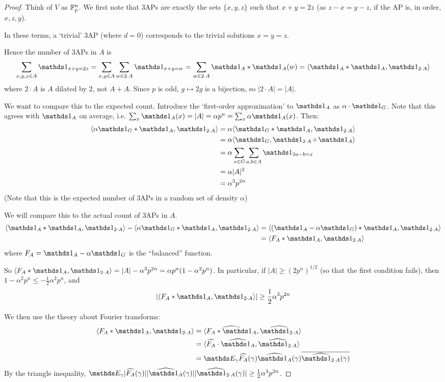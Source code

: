 \documentclass[10pt,a4paper]{article}
\begin{document}
\begin{proof}
  Think of $V$ as $\mathbb{F}_p^n$. We first note that 3APs are exactly the sets $\{x,y,z\}$ such that $x+y=2z$ (as $z-x = y-z$, if the AP is, in order, $x,z,y$).

  In these terms, a `trivial' 3AP (where $d=0$) corresponds to the trivial solutions $x=y=z$.

  Hence the number of 3APs in $A$ is
  \[\sum_{x,y,z \in A} \one_{x+y=2z} = \sum_{x,y \in A} \sum_{w \in 2\cdot A} \one_{x+y=w} = \sum_{w \in 2\cdot A} \one_A \ast \one_A(w) = \angle{\one_A \ast \one_A, \one_{2\cdot A}}\]
  where $2\cdot A$ is $A$ dilated by $2$, not $A+A$. Since $p$ is odd, $g \mapsto 2g$ is a bijection, so $|2\cdot A| = |A|$.

  We want to compare this to the expected count. Introduce the `first-order approximation' to $\one_A$ as $\alpha \cdot \one_G$. Note that this agrees with $\one_A$ on average, i.e. $\sum_x \one_A(x) = |A| = \alpha p^n = \sum_x \alpha \one_A(x)$. Then:
  \begin{align*}
    \angle{\alpha \one_G \ast \one_A, \one_{2\cdot A}} &= \alpha \angle{\one_G\ast \one_A, \one_{2\cdot A}}\\
    &= \alpha \angle{\one_G, \one_{2\cdot A} \circ \one_A}\\
    &= \alpha \sum_{x \in G}\sum_{a,b \in A} \one_{2a-b =x}\\
    &= \alpha|A|^2\\
    &= \alpha^3p^{2n}
  \end{align*}
  (Note that this is the expected number of 3APs in a random set of density $\alpha$)

  We will compare this to the actual count of 3APs in $A$.
  \begin{align*}
    \angle{\one_A\ast \one_A, \one_{2\cdot A}} - \angle{\alpha\one_G\ast \one_A, \one_{2\cdot A}} &= \angle{(\one_A-\alpha\one_G)\ast \one_A, \one_{2\cdot A}}\\
    &=\angle{F_A\ast \one_A, \one_{2\cdot A}}
  \end{align*}
  where $F_A = \one_A - \alpha\one_G$ is the ``balanced'' function.

  So $\angle{F_A\ast \one_A, \one_{2\cdot A}} = |A|-\alpha^3 p^{2n} = \alpha p^n(1-\alpha^2 p^n)$. In particular, if $|A| \geq (2p^n)^{1/2}$ (so that the first condition fails), then $1-\alpha^2p^n \leq -\frac{1}{2}\alpha^2p^n$, and
  \[|\angle{F_A \ast \one_A, \one_{2\cdot A}}| \geq \frac{1}{2}\alpha^3 p^{2n}\]

  We then use the theory about Fourier transforms:
  \begin{align*}
    \angle{F_A \ast \one_A, \one_{2\cdot A}} &= \angle{\widehat{F_A\ast \one_A}, \hat{\one_{2\cdot A}}}\\
    &= \angle{\hat{F_A}\cdot \hat{\one_A}, \hat{\one_{2\cdot A}}}\\
    &= \E_\gamma \hat{F_A}(\gamma)\hat{\one_A}(\gamma)\overline{\hat{\one_{2\cdot A}}(\gamma)}
  \end{align*}
  By the triangle inequality, $\E_\gamma |\hat{F_A}(\gamma)||\hat{\one_A}(\gamma)||\hat{\one_{2\cdot A}}(\gamma)| \geq \frac{1}{2}\alpha^3 p^{2n}$.


\end{proof}
\end{document}
